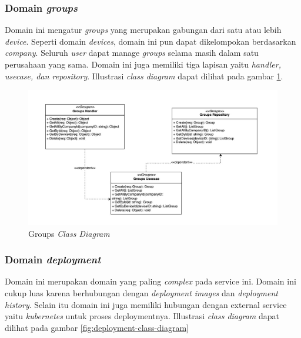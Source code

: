 \subsubsection{Domain \textit{groups}}

Domain ini mengatur \textit{groups} yang merupakan gabungan dari satu atau lebih \textit{device}. Seperti domain \textit{devices}, domain ini pun dapat dikelompokan berdasarkan \textit{company}. Seluruh \textit{user} dapat manage \textit{groups} selama masih dalam satu perusahaan yang sama. Domain ini juga memiliki tiga lapisan yaitu \textit{handler, usecase, dan repository}. Illustrasi \textit{class diagram} dapat dilihat pada gambar \ref{fig:groups-class-diagram}.

\begin{figure}[ht]
  \centering
  \includegraphics[width=1\textwidth]{resources/chapter-3/class/groups-class-diagram.jpg}
  \caption{Groups \textit{Class Diagram}}
  \label{fig:groups-class-diagram}
\end{figure}

\pagebreak

\subsubsection{Domain \textit{deployment}}

Domain ini merupakan domain yang paling \textit{complex} pada service ini. Domain ini cukup luas karena berhubungan dengan \textit{deployment images} dan \textit{deployment history}. Selain itu domain ini juga memiliki hubungan dengan external service yaitu \textit{kubernetes} untuk proses deploymentnya. Illustrasi \textit{class diagram} dapat dilihat pada gambar \ref{fig:deployment-class-diagram}

